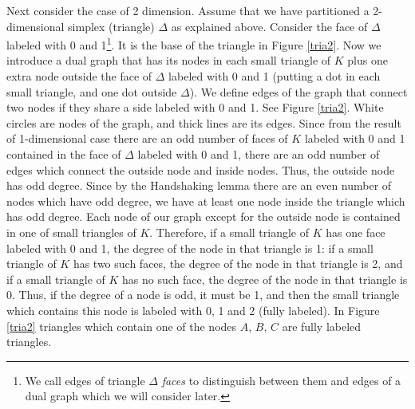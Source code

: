 \documentclass[reqno]{amsart}
\begin{document}
Next consider the case of 2 dimension. Assume that we have partitioned a 2-dimensional simplex (triangle) $\Delta$ as explained above. Consider the face of $\Delta$ labeled with 0 and 1\footnote{We call edges of triangle $\Delta$ \emph{faces} to distinguish between them and edges of a dual graph which we will consider later.}. It is the base of the triangle in Figure \ref{tria2}. Now we introduce a dual graph that has its nodes in each small triangle of $K$ plus one extra node outside the face of $\Delta$ labeled with 0 and 1 (putting a dot in each small triangle, and one dot outside $\Delta$). We define edges of the graph that connect two nodes if they share a side labeled with 0 and 1. See Figure \ref{tria2}. White circles are nodes of the graph, and thick lines are its edges. Since from the result of 1-dimensional case there are an odd number of faces of $K$ labeled with 0 and 1 contained in the face of $\Delta$ labeled with 0 and 1, there are an odd number of edges which connect the outside node and inside nodes. Thus, the outside node has odd degree. Since by the Handshaking lemma there are an even number of nodes which have odd degree, we have at least one node inside the triangle which has odd degree. Each node of our graph except for the outside node is contained in one of small triangles of $K$. Therefore, if a small triangle of $K$ has one face labeled with 0 and 1, the degree of the node in that triangle is 1: if a small triangle of $K$ has two such faces, the degree of the node in that triangle is 2, and if a small triangle of $K$ has no such face, the degree of the node in that triangle is 0. Thus, if the degree of a node is odd, it must be 1, and then the small triangle which contains this node is labeled with 0, 1 and 2 (fully labeled). In Figure \ref{tria2} triangles which contain one of the nodes $A$, $B$, $C$ are fully labeled triangles.
\end{document}
